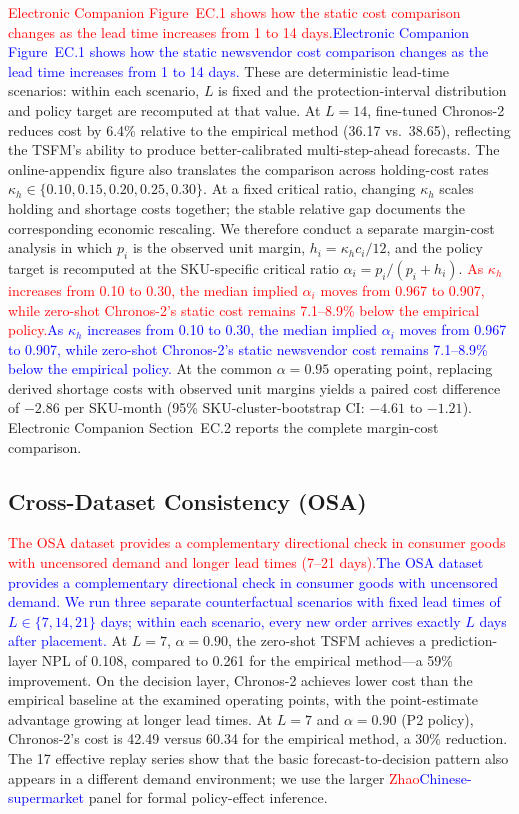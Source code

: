 \documentclass[msom,dblanonrev]{informs4}
\newcommand{\add}[1]{\textcolor{blue}{#1}}
\newcommand{\reduce}[1]{\textcolor{red}{#1}\hspace{0.5em}}
\begin{document}
\reduce{Electronic Companion Figure~EC.1 shows how the static cost comparison changes as the lead time increases from 1 to 14 days.}\add{Electronic Companion Figure~EC.1 shows how the static newsvendor cost comparison changes as the lead time increases from 1 to 14 days.}
These are deterministic lead-time scenarios: within each scenario, $L$ is fixed and the protection-interval distribution and policy target are recomputed at that value.
At $L = 14$, fine-tuned Chronos-2 reduces cost by 6.4\% relative to the empirical method (36.17 vs.\ 38.65), reflecting the TSFM's ability to produce better-calibrated multi-step-ahead forecasts.
The online-appendix figure also translates the comparison across holding-cost rates $\kappa_h \in \{0.10, 0.15, 0.20, 0.25, 0.30\}$.
At a fixed critical ratio, changing $\kappa_h$ scales holding and shortage costs together; the stable relative gap documents the corresponding economic rescaling.
We therefore conduct a separate margin-cost analysis in which $p_i$ is the observed unit margin, $h_i=\kappa_h c_i/12$, and the policy target is recomputed at the SKU-specific critical ratio $\alpha_i=p_i/(p_i+h_i)$.
\reduce{As $\kappa_h$ increases from 0.10 to 0.30, the median implied $\alpha_i$ moves from 0.967 to 0.907, while zero-shot Chronos-2's static cost remains 7.1--8.9\% below the empirical policy.}\add{As $\kappa_h$ increases from 0.10 to 0.30, the median implied $\alpha_i$ moves from 0.967 to 0.907, while zero-shot Chronos-2's static newsvendor cost remains 7.1--8.9\% below the empirical policy.}
At the common $\alpha=0.95$ operating point, replacing derived shortage costs with observed unit margins yields a paired cost difference of $-2.86$ per SKU-month (95\% SKU-cluster-bootstrap CI: $-4.61$ to $-1.21$).
Electronic Companion Section~EC.2 reports the complete margin-cost comparison.

\subsection{Cross-Dataset Consistency (OSA)}

\reduce{The OSA dataset provides a complementary directional check in consumer goods with uncensored demand and longer lead times (7--21 days).}\add{The OSA dataset provides a complementary directional check in consumer goods with uncensored demand. We run three separate counterfactual scenarios with fixed lead times of $L\in\{7,14,21\}$ days; within each scenario, every new order arrives exactly $L$ days after placement.}
At $L = 7$, $\alpha = 0.90$, the zero-shot TSFM achieves a prediction-layer NPL of 0.108, compared to 0.261 for the empirical method---a 59\% improvement.
On the decision layer, Chronos-2 achieves lower cost than the empirical baseline at the examined operating points, with the point-estimate advantage growing at longer lead times.
At $L = 7$ and $\alpha = 0.90$ (P2 policy), Chronos-2's cost is 42.49 versus 60.34 for the empirical method, a 30\% reduction.
The 17 effective replay series show that the basic forecast-to-decision pattern also appears in a different demand environment; we use the larger \reduce{Zhao}\add{Chinese-supermarket} panel for formal policy-effect inference.
\end{document}

